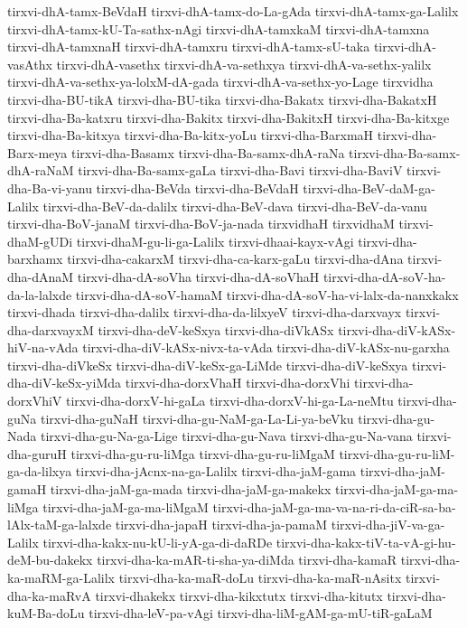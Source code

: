 {tirxvi-dhA-tamx-BeVdaH
tirxvi-dhA-tamx-do-La-gAda
tirxvi-dhA-tamx-ga-Lalilx
tirxvi-dhA-tamx-kU-Ta-sathx-nAgi
tirxvi-dhA-tamxkaM
tirxvi-dhA-tamxna
tirxvi-dhA-tamxnaH
tirxvi-dhA-tamxru
tirxvi-dhA-tamx-sU-taka
tirxvi-dhA-vasAthx
tirxvi-dhA-vasethx
tirxvi-dhA-va-sethxya
tirxvi-dhA-va-sethx-yalilx
tirxvi-dhA-va-sethx-ya-lolxM-dA-gada
tirxvi-dhA-va-sethx-yo-Lage
tirxvidha
tirxvi-dha-BU-tikA
tirxvi-dha-BU-tika
tirxvi-dha-Bakatx
tirxvi-dha-BakatxH
tirxvi-dha-Ba-katxru
tirxvi-dha-Bakitx
tirxvi-dha-BakitxH
tirxvi-dha-Ba-kitxge
tirxvi-dha-Ba-kitxya
tirxvi-dha-Ba-kitx-yoLu
tirxvi-dha-BarxmaH
tirxvi-dha-Barx-meya
tirxvi-dha-Basamx
tirxvi-dha-Ba-samx-dhA-raNa
tirxvi-dha-Ba-samx-dhA-raNaM
tirxvi-dha-Ba-samx-gaLa
tirxvi-dha-Bavi
tirxvi-dha-BaviV
tirxvi-dha-Ba-vi-yanu
tirxvi-dha-BeVda
tirxvi-dha-BeVdaH
tirxvi-dha-BeV-daM-ga-Lalilx
tirxvi-dha-BeV-da-dalilx
tirxvi-dha-BeV-dava
tirxvi-dha-BeV-da-vanu
tirxvi-dha-BoV-janaM
tirxvi-dha-BoV-ja-nada
tirxvidhaH
tirxvidhaM
tirxvi-dhaM-gUDi
tirxvi-dhaM-gu-li-ga-Lalilx
tirxvi-dhaai-kayx-vAgi
tirxvi-dha-barxhamx
tirxvi-dha-cakarxM
tirxvi-dha-ca-karx-gaLu
tirxvi-dha-dAna
tirxvi-dha-dAnaM
tirxvi-dha-dA-soVha
tirxvi-dha-dA-soVhaH
tirxvi-dha-dA-soV-ha-da-la-lalxde
tirxvi-dha-dA-soV-hamaM
tirxvi-dha-dA-soV-ha-vi-lalx-da-nanxkakx
tirxvi-dhada
tirxvi-dha-dalilx
tirxvi-dha-da-lilxyeV
tirxvi-dha-darxvayx
tirxvi-dha-darxvayxM
tirxvi-dha-deV-keSxya
tirxvi-dha-diVkASx
tirxvi-dha-diV-kASx-hiV-na-vAda
tirxvi-dha-diV-kASx-nivx-ta-vAda
tirxvi-dha-diV-kASx-nu-garxha
tirxvi-dha-diVkeSx
tirxvi-dha-diV-keSx-ga-LiMde
tirxvi-dha-diV-keSxya
tirxvi-dha-diV-keSx-yiMda
tirxvi-dha-dorxVhaH
tirxvi-dha-dorxVhi
tirxvi-dha-dorxVhiV
tirxvi-dha-dorxV-hi-gaLa
tirxvi-dha-dorxV-hi-ga-La-neMtu
tirxvi-dha-guNa
tirxvi-dha-guNaH
tirxvi-dha-gu-NaM-ga-La-Li-ya-beVku
tirxvi-dha-gu-Nada
tirxvi-dha-gu-Na-ga-Lige
tirxvi-dha-gu-Nava
tirxvi-dha-gu-Na-vana
tirxvi-dha-guruH
tirxvi-dha-gu-ru-liMga
tirxvi-dha-gu-ru-liMgaM
tirxvi-dha-gu-ru-liM-ga-da-lilxya
tirxvi-dha-jAcnx-na-ga-Lalilx
tirxvi-dha-jaM-gama
tirxvi-dha-jaM-gamaH
tirxvi-dha-jaM-ga-mada
tirxvi-dha-jaM-ga-makekx
tirxvi-dha-jaM-ga-ma-liMga
tirxvi-dha-jaM-ga-ma-liMgaM
tirxvi-dha-jaM-ga-ma-va-na-ri-da-ciR-sa-ba-lAlx-taM-ga-lalxde
tirxvi-dha-japaH
tirxvi-dha-ja-pamaM
tirxvi-dha-jiV-va-ga-Lalilx
tirxvi-dha-kakx-nu-kU-li-yA-ga-di-daRDe
tirxvi-dha-kakx-tiV-ta-vA-gi-hu-deM-bu-dakekx
tirxvi-dha-ka-mAR-ti-sha-ya-diMda
tirxvi-dha-kamaR
tirxvi-dha-ka-maRM-ga-Lalilx
tirxvi-dha-ka-maR-doLu
tirxvi-dha-ka-maR-nAsitx
tirxvi-dha-ka-maRvA
tirxvi-dhakekx
tirxvi-dha-kikxtutx
tirxvi-dha-kitutx
tirxvi-dha-kuM-Ba-doLu
tirxvi-dha-leV-pa-vAgi
tirxvi-dha-liM-gAM-ga-mU-tiR-gaLaM
}
